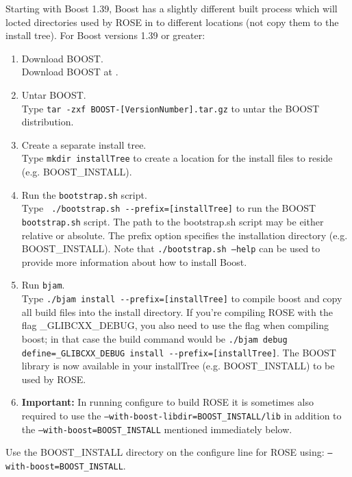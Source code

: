 Starting with Boost 1.39, Boost has a slightly different built process which
will locted directories used by ROSE in to different locations (not copy them to the
install tree). For Boost versions 1.39 or greater:
\begin{enumerate}
     \item Download BOOST. \\
       Download BOOST at .
     \item Untar BOOST. \\
       Type {\tt tar -zxf BOOST-[VersionNumber].tar.gz} to untar the BOOST distribution.
     \item Create a separate install tree. \\
           Type {\tt mkdir installTree} to create a location for the install files to reside (e.g. BOOST\_INSTALL).
     \item Run the {\tt bootstrap.sh} script. \\
           Type \verb! ./bootstrap.sh --prefix=[installTree]! 
           to run the BOOST {\tt bootstrap.sh} script.  The path to the bootstrap.sh script 
           may be either relative or absolute. The prefix option specifies the
           installation directory (e.g. BOOST\_INSTALL). Note that 
           {\tt ./bootstrap.sh --help} can be used to provide more information about how
           to install Boost.
     \item Run {\tt bjam}. \\
           Type \verb!./bjam install --prefix=[installTree]! to compile boost and
           copy all build files into the install directory. If you're compiling ROSE with the flag \_GLIBCXX\_DEBUG, you also
           need to use the flag when compiling boost; in that case the build command would be
           \verb!./bjam debug define=_GLIBCXX_DEBUG install --prefix=[installTree]!. 
            The  BOOST library is now available in your 
           installTree (e.g. BOOST\_INSTALL) to be used by ROSE.
           \item {\bf Important:} In running configure to build ROSE it is sometimes also required to use the 
           {\tt --with-boost-libdir=BOOST\_INSTALL/lib} in addition to the {\tt --with-boost=BOOST\_INSTALL}
           mentioned immediately below.
\end{enumerate}

Use the BOOST\_INSTALL directory on the configure line for ROSE using: {\tt --with-boost=BOOST\_INSTALL}.

